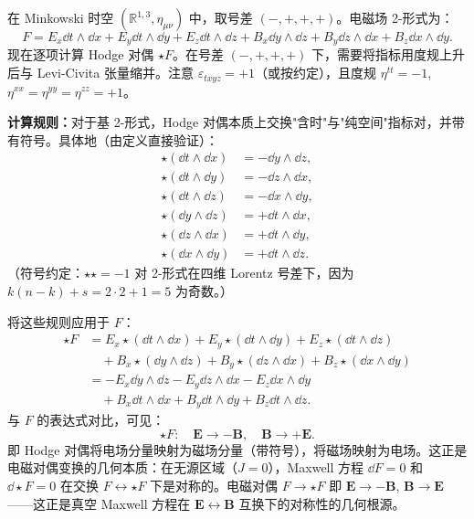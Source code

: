 \begin{example}
在 Minkowski 时空 $(\mathbb{R}^{1,3}, \eta_{\mu\nu})$ 中，取号差 $(-,+,+,+)$。电磁场 2-形式为：
\begin{equation}
    F = E_x \dd t \wedge \dd x + E_y \dd t \wedge \dd y + E_z \dd t \wedge \dd z
      + B_x \dd y \wedge \dd z + B_y \dd z \wedge \dd x + B_z \dd x \wedge \dd y.
\end{equation}
现在逐项计算 Hodge 对偶 $\star F$。在号差 $(-,+,+,+)$ 下，需要将指标用度规上升后与 Levi-Civita 张量缩并。注意 $\varepsilon_{txyz} = +1$（或按约定），且度规 $\eta^{tt} = -1$, $\eta^{xx} = \eta^{yy} = \eta^{zz} = +1$。

\textbf{计算规则：}对于基 2-形式，Hodge 对偶本质上交换"含时"与"纯空间"指标对，并带有符号。具体地（由定义直接验证）：
\begin{align}
    \star(\dd t \wedge \dd x) &= -\dd y \wedge \dd z, \\
    \star(\dd t \wedge \dd y) &= -\dd z \wedge \dd x, \\
    \star(\dd t \wedge \dd z) &= -\dd x \wedge \dd y, \\[4pt]
    \star(\dd y \wedge \dd z) &= +\dd t \wedge \dd x, \\
    \star(\dd z \wedge \dd x) &= +\dd t \wedge \dd y, \\
    \star(\dd x \wedge \dd y) &= +\dd t \wedge \dd z.
\end{align}
（符号约定：$\star\!\star = -1$ 对 2-形式在四维 Lorentz 号差下，因为 $k(n-k)+s = 2\cdot2+1 = 5$ 为奇数。）

将这些规则应用于 $F$：
\begin{align}
    \star F &= E_x \star(\dd t \wedge \dd x) + E_y \star(\dd t \wedge \dd y) + E_z \star(\dd t \wedge \dd z) \nonumber\\
            &\quad + B_x \star(\dd y \wedge \dd z) + B_y \star(\dd z \wedge \dd x) + B_z \star(\dd x \wedge \dd y) \nonumber\\[4pt]
            &= -E_x \dd y \wedge \dd z - E_y \dd z \wedge \dd x - E_z \dd x \wedge \dd y \nonumber\\
            &\quad + B_x \dd t \wedge \dd x + B_y \dd t \wedge \dd y + B_z \dd t \wedge \dd z.
\end{align}
与 $F$ 的表达式对比，可见：
\begin{equation}
    \boxed{\star F: \quad \mathbf{E} \to -\mathbf{B}, \quad \mathbf{B} \to +\mathbf{E}}.
\end{equation}
即 Hodge 对偶将电场分量映射为磁场分量（带符号），将磁场映射为电场。这正是电磁对偶变换的几何本质：在无源区域（$J=0$），Maxwell 方程 $\dd F = 0$ 和 $\dd \star F = 0$ 在交换 $F \leftrightarrow \star F$ 下是对称的。电磁对偶 $F \to \star F$ 即 $\mathbf{E} \to -\mathbf{B}$, $\mathbf{B} \to \mathbf{E}$——这正是真空 Maxwell 方程在 $\mathbf{E} \leftrightarrow \mathbf{B}$ 互换下的对称性的几何根源。
\end{example}

